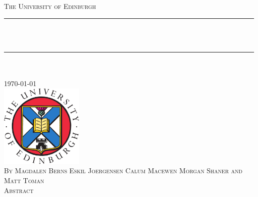 \documentclass[12pt, a4paper, oneside]{Thesis}
\title{\ttitle}
\begin{document}
\frontmatter %
\fancyhead{} %
\rhead{\thepage} %
\lhead{} %
\pagestyle{fancy}
\newcommand{\HRule}{\rule{\linewidth}{0.5mm}} %




\begin{titlepage}
\begin{center}

\textsc{\LARGE The University of Edinburgh}\\[1.5cm]
\HRule \\[0.8cm] %

\textsc{\huge \bfseries \ttitle }\\[0.2cm]
\HRule \\[0.5cm] %
\textsc{\Large \deptname}\\[1.0cm]

\large \today \\[1cm]

\includegraphics[width=4.0cm]{logo}\\[1cm]

\textsc{\small By Magdalen Berns Eskil Joergensen Calum Macewen Morgan Shaner and Matt Toman} \\[1cm]

\textsc{\Large{Abstract}}\\

\end{center}

\end{titlepage}


\end{document}
